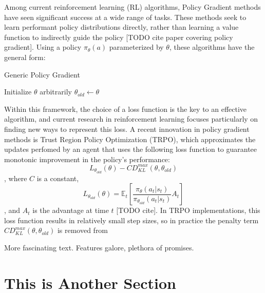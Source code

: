 \documentclass[letterpaper,twocolumn,10pt]{article}
\begin{document}
Among current reinforcement learning (RL) algorithms, Policy Gradient methods
have seen significant success at a wide range of tasks. These methods seek to
learn performant policy distributions directly, rather than learning a value
function to indirectly guide the policy [TODO cite paper covering policy
gradient]. Using a policy $\pi_{\theta}(a)$ parameterized by $\theta$, these
algorithms have the general form: 
\begin{algorithm}[H]
    \caption{Generic Policy Gradient}
    \begin{algorithmic}
        \State Initialize $\theta$ arbitrarily
            \State $\theta_{old} \gets \theta$
        \EndWhile
    \end{algorithmic}
\end{algorithm}
Within this framework, the choice of a loss function is the key to an effective
algorithm, and current research in reinforcement learning focuses particularly
on finding new ways to represent this loss. A recent innovation in policy
gradient methods is Trust Region Policy Optimization (TRPO), which approximates
the updates perfomed by an agent that uses the following loss function to 
guarantee monotonic improvement in the policy's performance:
\begin{equation}
    L_{\theta_{old}}(\theta) 
    - CD_{KL}^{max}(\theta, \theta_{old})
\end{equation}
, where $C$ is a constant,
$$L_{\theta_{old}}(\theta) =
            \mathbb{E}_t \left[ 
            \frac
            {\pi_{\theta}(a_t | s_t)}
            {\pi_{\theta_{old}} (a_t | s_t)}
            A_t
            \right]$$, and $A_t$ is the advantage at time $t$ [TODO cite].
In TRPO implementations, this loss function results in relatively
small step sizes, so in practice the penalty term $CD_{KL}^{max}(\theta,
\theta_{old})$ is removed from 

More fascinating text. Features galore, plethora of promises.\\

\section{This is Another Section}
\end{document}
